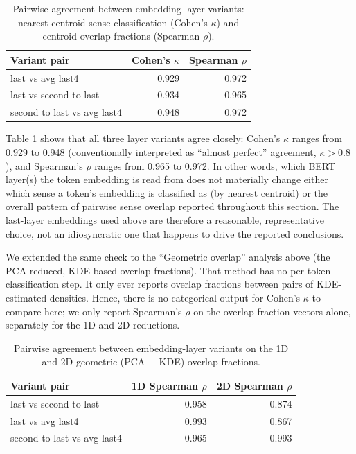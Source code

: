 \documentclass[
]{article}
\begin{document}
\begin{table}[H]
\centering
\caption{\label{tab:unnamed-chunk-29}Pairwise agreement between embedding-layer variants: nearest-centroid sense classification (Cohen's $\kappa$) and centroid-overlap fractions (Spearman $\rho$).\label{tab:variantAgreement}}
\centering
\begin{tabular}[t]{lrr}
\toprule
Variant pair & Cohen's $\kappa$ & Spearman $\rho$\\
\midrule
last vs avg last4 & 0.929 & 0.972\\
last vs second to last & 0.934 & 0.965\\
second to last vs avg last4 & 0.948 & 0.972\\
\bottomrule
\end{tabular}
\end{table}

Table \ref{tab:variantAgreement} shows that all three layer variants
agree closely: Cohen's \(\kappa\) ranges from 0.929 to 0.948
(conventionally interpreted as ``almost perfect'' agreement,
\(\kappa > 0.8\)), and Spearman's \(\rho\) ranges from 0.965 to 0.972.
In other words, which BERT layer(s) the token embedding is read from
does not materially change either which sense a token's embedding is
classified as (by nearest centroid) or the overall pattern of pairwise
sense overlap reported throughout this section. The last-layer
embeddings used above are therefore a reasonable, representative choice,
not an idiosyncratic one that happens to drive the reported conclusions.

We extended the same check to the ``Geometric overlap'' analysis above
(the PCA-reduced, KDE-based overlap fractions). That method has no
per-token classification step. It only ever reports overlap fractions
between pairs of KDE-estimated densities. Hence, there is no categorical
output for Cohen's \(\kappa\) to compare here; we only report Spearman's
\(\rho\) on the overlap-fraction vectors alone, separately for the 1D
and 2D reductions.

\begin{table}[H]
\centering
\caption{\label{tab:unnamed-chunk-30}Pairwise agreement between embedding-layer variants on the 1D and 2D geometric (PCA + KDE) overlap fractions.\label{tab:geoVariantAgreement}}
\centering
\begin{tabular}[t]{lrr}
\toprule
Variant pair & 1D Spearman $\rho$ & 2D Spearman $\rho$\\
\midrule
last vs second to last & 0.958 & 0.874\\
last vs avg last4 & 0.993 & 0.867\\
second to last vs avg last4 & 0.965 & 0.993\\
\bottomrule
\end{tabular}
\end{table}
\end{document}
